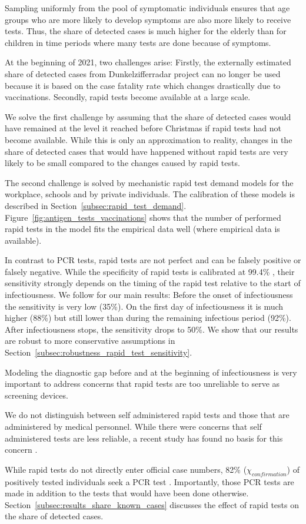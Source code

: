 Sampling uniformly from the pool of symptomatic individuals ensures that age groups who
are more likely to develop symptoms are also more likely to receive tests. Thus, the
share of detected cases is much higher for the elderly than for children in time periods
where many tests are done because of symptoms.

At the beginning of 2021, two challenges arise: Firstly, the externally estimated share
of detected cases from Dunkelzifferradar project \citep{Dunkelzifferradar2020} can no
longer be used because it is based on the case fatality rate which changes drastically
due to vaccinations. Secondly, rapid tests become available at a large scale.

We solve the first challenge by assuming that the share of detected cases would have
remained at the level it reached before Christmas if rapid tests had not become
available. While this is only an approximation to reality, changes in the share of
detected cases that would have happened without rapid tests are very likely to be small
compared to the changes caused by rapid tests.

The second challenge is solved by mechanistic rapid test demand models for the
workplace, schools and by private individuals. The calibration of these models is
described in Section~\ref{subsec:rapid_test_demand}.
Figure~\ref{fig:antigen_tests_vaccinations} shows that the number of performed rapid
tests in the model fits the empirical data well (where empirical data is available).

In contrast to PCR tests, rapid tests are not perfect and can be falsely
positive or falsely negative. While the specificity of rapid tests is calibrated
at 99.4\% \citep{Bruemmer2021}, their sensitivity strongly depends on the timing
of the rapid test relative to the start of infectiousness. We follow
\cite{Smith2021} for our main results: Before the onset of infectiousness the
sensitivity is very low (35\%). On the first day of infectiousness it is much
higher (88\%) but still lower than during the remaining infectious period
(92\%). After infectiousness stops, the sensitivity drops to 50\%. We show that
our results are robust to more conservative assumptions in
Section~\ref{subsec:robustness_rapid_test_sensitivity}.

Modeling the diagnostic gap before and at the beginning of infectiousness is very
important to address concerns that rapid tests are too unreliable to serve as screening
devices.

We do not distinguish between self administered rapid tests and those that are
administered by medical personnel. While there were concerns that self administered
tests are less reliable, a recent study has found no basis for this
concern \citep{Lindner2020}.

While rapid tests do not directly enter official case numbers, 82\%
($\chi_{confirmation}$) of positively tested individuals seek a PCR test
\citep{Betsch2021}. Importantly, those PCR tests are made in addition to the tests that
would have been done otherwise. Section~\ref{subsec:results_share_known_cases} discusses
the effect of rapid tests on the share of detected cases.

